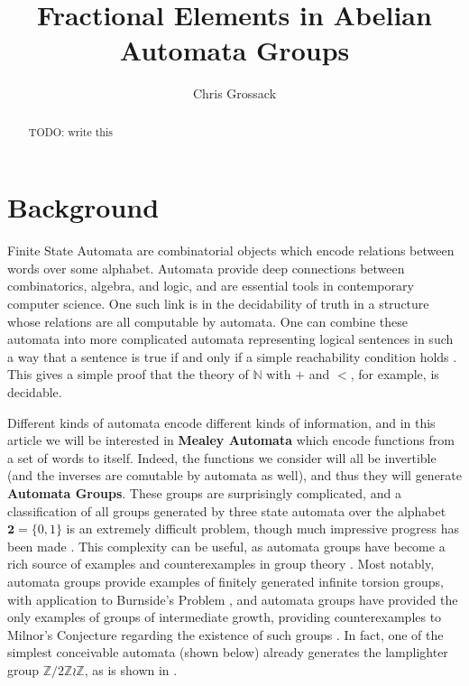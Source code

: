 \documentclass[runningheads]{llncs}
\title{Fractional Elements in Abelian Automata Groups}
\author{Chris Grossack\orcidID{0000-0001-7520-9747}}
\institute%
{%
  Carnegie Mellon University, Pittsburgh, USA\\
  \email{cgrossac@alumni.cmu.edu}
}
\newcommand{\Z}{\mathbb{Z}}
\newcommand{\2}{\textbf{2}}
\begin{document}
\maketitle

\begin{abstract}
  TODO: write this

\end{abstract}

\section{Background}
Finite State Automata are combinatorial objects which encode relations 
between words over some alphabet. Automata provide deep connections between
combinatorics, algebra, and logic, and are essential tools in contemporary 
computer science. One such link is in the decidability of truth in a structure
whose relations are all computable by automata. One can combine these automata 
into more complicated automata representing logical sentences in such a way 
that a sentence is true if and only if a simple reachability condition holds
\cite{Brny07:automatic_structures}. This gives a simple proof that the theory 
of $\mathbb{N}$ with $+$ and $<$, for example, is decidable.

Different kinds of automata encode different kinds of information, and
in this article we will be interested in \textbf{Mealey Automata} which encode
functions from a set of words to itself. Indeed, the functions we consider
will all be invertible (and the inverses are comutable by automata as well),
and thus they will generate \textbf{Automata Groups}.
These groups are surprisingly complicated, and a classification of all groups 
generated by three state automata over the alphabet $\2 = \{0,1\}$ is an 
extremely difficult problem, though much impressive progress has been 
made \cite{Bondarenko09:three_state}. This complexity can be useful, 
as automata groups have become a rich source of examples and counterexamples
in group theory
\cite{Nekrashevych05:self_similar_groups%
     ,Sidki00:one_rooted_trees%
     ,GrigorchukNS00:automata_groups%
     }. 
Most notably, automata groups provide examples of finitely generated 
infinite torsion groups, with application to 
Burnside's Problem \cite{Gupta83:burnside}, and automata groups have
provided the only examples of groups of intermediate growth, providing 
counterexamples to Milnor's Conjecture regarding the existence of such groups
\cite{Grigorchuk11:Milnor}. In fact, one of the simplest conceivable automata 
(shown below) already generates the lamplighter group $\Z/2\Z \wr \Z$, as
is shown in \cite{GrigorchukZuk01:lamplighter}.
\end{document}
